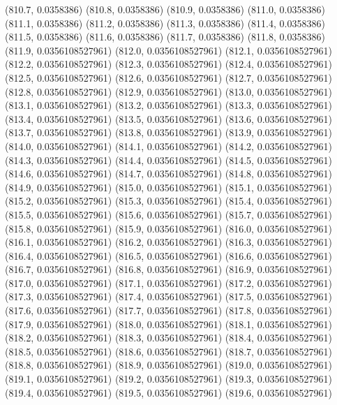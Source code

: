 {					(810.7, 0.0358386)
					(810.8, 0.0358386)
					(810.9, 0.0358386)
					(811.0, 0.0358386)
					(811.1, 0.0358386)
					(811.2, 0.0358386)
					(811.3, 0.0358386)
					(811.4, 0.0358386)
					(811.5, 0.0358386)
					(811.6, 0.0358386)
					(811.7, 0.0358386)
					(811.8, 0.0358386)
					(811.9, 0.0356108527961)
					(812.0, 0.0356108527961)
					(812.1, 0.0356108527961)
					(812.2, 0.0356108527961)
					(812.3, 0.0356108527961)
					(812.4, 0.0356108527961)
					(812.5, 0.0356108527961)
					(812.6, 0.0356108527961)
					(812.7, 0.0356108527961)
					(812.8, 0.0356108527961)
					(812.9, 0.0356108527961)
					(813.0, 0.0356108527961)
					(813.1, 0.0356108527961)
					(813.2, 0.0356108527961)
					(813.3, 0.0356108527961)
					(813.4, 0.0356108527961)
					(813.5, 0.0356108527961)
					(813.6, 0.0356108527961)
					(813.7, 0.0356108527961)
					(813.8, 0.0356108527961)
					(813.9, 0.0356108527961)
					(814.0, 0.0356108527961)
					(814.1, 0.0356108527961)
					(814.2, 0.0356108527961)
					(814.3, 0.0356108527961)
					(814.4, 0.0356108527961)
					(814.5, 0.0356108527961)
					(814.6, 0.0356108527961)
					(814.7, 0.0356108527961)
					(814.8, 0.0356108527961)
					(814.9, 0.0356108527961)
					(815.0, 0.0356108527961)
					(815.1, 0.0356108527961)
					(815.2, 0.0356108527961)
					(815.3, 0.0356108527961)
					(815.4, 0.0356108527961)
					(815.5, 0.0356108527961)
					(815.6, 0.0356108527961)
					(815.7, 0.0356108527961)
					(815.8, 0.0356108527961)
					(815.9, 0.0356108527961)
					(816.0, 0.0356108527961)
					(816.1, 0.0356108527961)
					(816.2, 0.0356108527961)
					(816.3, 0.0356108527961)
					(816.4, 0.0356108527961)
					(816.5, 0.0356108527961)
					(816.6, 0.0356108527961)
					(816.7, 0.0356108527961)
					(816.8, 0.0356108527961)
					(816.9, 0.0356108527961)
					(817.0, 0.0356108527961)
					(817.1, 0.0356108527961)
					(817.2, 0.0356108527961)
					(817.3, 0.0356108527961)
					(817.4, 0.0356108527961)
					(817.5, 0.0356108527961)
					(817.6, 0.0356108527961)
					(817.7, 0.0356108527961)
					(817.8, 0.0356108527961)
					(817.9, 0.0356108527961)
					(818.0, 0.0356108527961)
					(818.1, 0.0356108527961)
					(818.2, 0.0356108527961)
					(818.3, 0.0356108527961)
					(818.4, 0.0356108527961)
					(818.5, 0.0356108527961)
					(818.6, 0.0356108527961)
					(818.7, 0.0356108527961)
					(818.8, 0.0356108527961)
					(818.9, 0.0356108527961)
					(819.0, 0.0356108527961)
					(819.1, 0.0356108527961)
					(819.2, 0.0356108527961)
					(819.3, 0.0356108527961)
					(819.4, 0.0356108527961)
					(819.5, 0.0356108527961)
					(819.6, 0.0356108527961)
}
